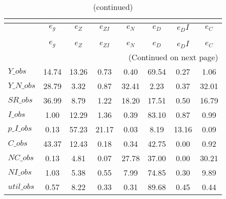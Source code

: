  
\begin{center}
\begin{longtable}{lccccccc} 
\caption{VARIANCE DECOMPOSITION (in percent)}\\
 \label{Table:th_var_decomp_uncond}\\
\toprule 
$           $	 & 	 $       {e_g}$	 & 	 $       {e_Z}$	 & 	 $    {e_{ZI}}$	 & 	 $       {e_N}$	 & 	 $       {e_D}$	 & 	 $      {e_DI}$	 & 	 $       {e_C}$\\
\midrule \endfirsthead 
\caption{(continued)}\\
 \toprule \\ 
$           $	 & 	 $       {e_g}$	 & 	 $       {e_Z}$	 & 	 $    {e_{ZI}}$	 & 	 $       {e_N}$	 & 	 $       {e_D}$	 & 	 $      {e_DI}$	 & 	 $       {e_C}$\\
\midrule \endhead 
\midrule \multicolumn{8}{r}{(Continued on next page)} \\ \bottomrule \endfoot 
\bottomrule \endlastfoot 
$Y\_obs     $	 & 	       14.74	 & 	       13.26	 & 	        0.73	 & 	        0.40	 & 	       69.54	 & 	        0.27	 & 	        1.06 \\ 
$Y\_N\_obs  $	 & 	       28.79	 & 	        3.32	 & 	        0.87	 & 	       32.41	 & 	        2.23	 & 	        0.37	 & 	       32.01 \\ 
$SR\_obs    $	 & 	       36.99	 & 	        8.79	 & 	        1.22	 & 	       18.20	 & 	       17.51	 & 	        0.50	 & 	       16.79 \\ 
$I\_obs     $	 & 	        1.00	 & 	       12.29	 & 	        1.36	 & 	        0.39	 & 	       83.10	 & 	        0.87	 & 	        0.99 \\ 
$p\_I\_obs  $	 & 	        0.13	 & 	       57.23	 & 	       21.17	 & 	        0.03	 & 	        8.19	 & 	       13.16	 & 	        0.09 \\ 
$C\_obs     $	 & 	       43.37	 & 	       12.43	 & 	        0.18	 & 	        0.34	 & 	       42.75	 & 	        0.00	 & 	        0.92 \\ 
$NC\_obs    $	 & 	        0.13	 & 	        4.81	 & 	        0.07	 & 	       27.78	 & 	       37.00	 & 	        0.00	 & 	       30.21 \\ 
$NI\_obs    $	 & 	        1.03	 & 	        5.38	 & 	        0.55	 & 	        7.99	 & 	       74.85	 & 	        0.30	 & 	        9.89 \\ 
$util\_obs  $	 & 	        0.57	 & 	        8.22	 & 	        0.33	 & 	        0.31	 & 	       89.68	 & 	        0.45	 & 	        0.44 \\ 

\end{longtable}
\end{center}
